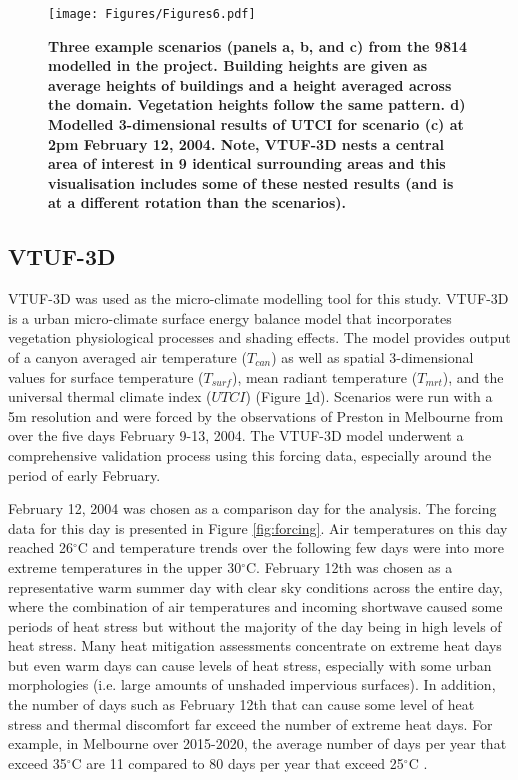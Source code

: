 \documentclass[final,3p,times,authoryear]{elsarticle}
\begin{document}
\begin{figure}
\centering
\texttt{[image: Figures/Figures6.pdf]}
\caption{\bf Three example scenarios (panels a, b, and c) from the 9814 modelled in the project. Building heights are given as average heights of buildings and a height averaged across the domain. Vegetation heights follow the same pattern. d) Modelled 3-dimensional results of UTCI for scenario (c) at 2pm February 12, 2004. Note, VTUF-3D nests a central area of interest in 9 identical surrounding areas and this visualisation includes some of these nested results (and is at a different rotation than the scenarios). }
 \label{fig:scenarios}
\end{figure} 

\subsection{VTUF-3D}\label{sec:methodsvtuf}
VTUF-3D \citep{Nice2018a} was used as the micro-climate modelling tool for this study. VTUF-3D is a urban micro-climate surface energy balance model that incorporates vegetation physiological processes and shading effects. The model provides output of a canyon averaged air temperature ($T_{can}$) as well as spatial 3-dimensional values for surface temperature ($T_{surf}$), mean radiant temperature ($T_{mrt}$), and the universal thermal climate index ($UTCI$) (Figure \ref{fig:scenarios}d). Scenarios were run with a 5m resolution and were forced by the observations of Preston in Melbourne from \cite{Coutts2007} over the five days February 9-13, 2004. The VTUF-3D model underwent a comprehensive validation process \citep{Nice2016,Nice2018a} using this forcing data, especially around the period of early February.



February 12, 2004 was chosen as a comparison day for the analysis. The forcing data for this day is presented in Figure \ref{fig:forcing}. Air temperatures on this day reached 26$^{\circ}$C and temperature trends over the following few days were into more extreme temperatures in the upper 30$^{\circ}$C. February 12th was chosen as a representative warm summer day with clear sky conditions across the entire day, where the combination of air temperatures and incoming shortwave caused some periods of heat stress but without the majority of the day being in high levels of heat stress. Many heat mitigation assessments concentrate on extreme heat days but even warm days can cause levels of heat stress, especially with some urban morphologies (i.e. large amounts of unshaded impervious surfaces). In addition, the number of days such as February 12th that can cause some level of heat stress and thermal discomfort far exceed the number of extreme heat days. For example, in Melbourne over 2015-2020, the average number of days per year that exceed 35$^{\circ}$C are 11 compared to 80 days per year that exceed 25$^{\circ}$C \citep{BureauofMeteorology2021}.
\end{document}
